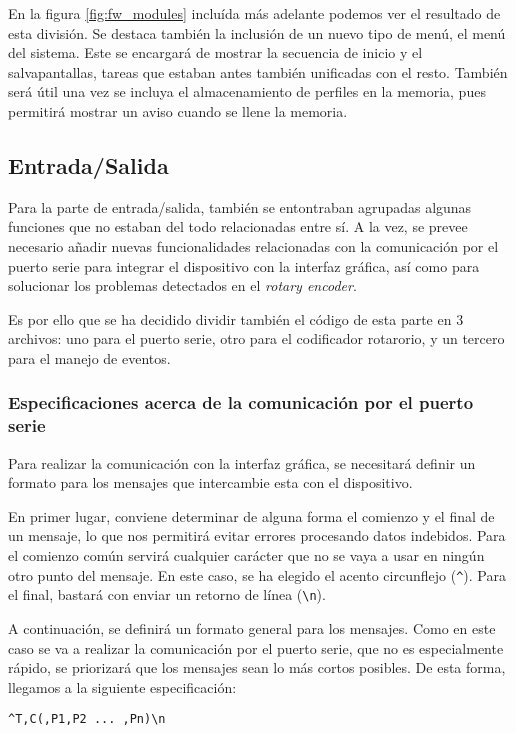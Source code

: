 En la figura \ref{fig:fw_modules} incluída más adelante podemos ver el resultado de esta división. Se destaca también la inclusión de un nuevo tipo de menú, el menú del sistema. Este se encargará de mostrar la secuencia de inicio y el salvapantallas, tareas que estaban antes también unificadas con el resto. También será útil una vez se incluya el almacenamiento de perfiles en la memoria, pues permitirá mostrar un aviso cuando se llene la memoria.

\subsection{Entrada/Salida}

Para la parte de entrada/salida, también se entontraban agrupadas algunas funciones que no estaban del todo relacionadas entre sí. A la vez, se prevee necesario añadir nuevas funcionalidades relacionadas con la comunicación por el puerto serie para integrar el dispositivo con la interfaz gráfica, así como para solucionar los problemas detectados en el \textit{rotary encoder}.

Es por ello que se ha decidido dividir también el código de esta parte en 3 archivos: uno para el puerto serie, otro para el codificador rotarorio, y un tercero para el manejo de eventos.

\subsubsection{Especificaciones acerca de la comunicación por el puerto serie}

Para realizar la comunicación con la interfaz gráfica, se necesitará definir un formato para los mensajes que intercambie esta con el dispositivo.

En primer lugar, conviene determinar de alguna forma el comienzo y el final de un mensaje, lo que nos permitirá evitar errores procesando datos indebidos. Para el comienzo común servirá cualquier carácter que no se vaya a usar en ningún otro punto del mensaje. En este caso, se ha elegido el acento circunflejo (\verb|^|). Para el final, bastará con enviar un retorno de línea (\verb|\n|).

A continuación, se definirá un formato general para los mensajes. Como en este caso se va a realizar la comunicación por el puerto serie, que no es especialmente rápido, se priorizará que los mensajes sean lo más cortos posibles. De esta forma, llegamos a la siguiente especificación:

\begin{center}
    {\selectfont\verb|^T,C(,P1,P2 ... ,Pn)\n|}
\end{center}

